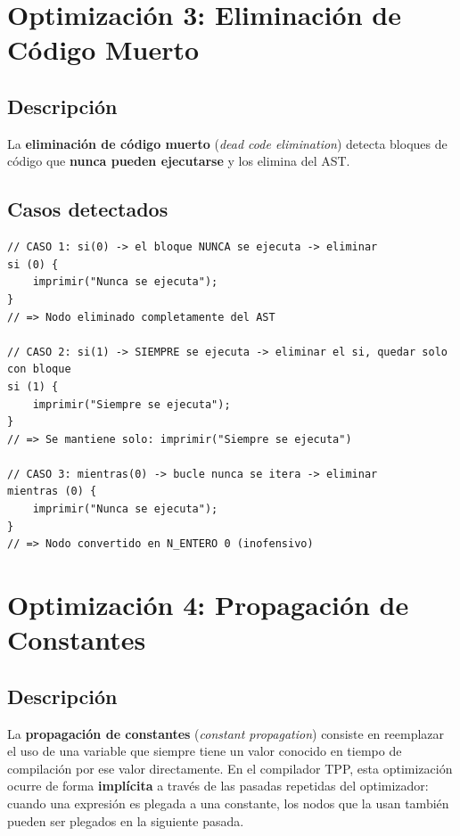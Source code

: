 \section{Optimización 3: Eliminación de Código Muerto}

\subsection{Descripción}

La \textbf{eliminación de código muerto} (\textit{dead code elimination}) detecta bloques de código que \textbf{nunca pueden ejecutarse} y los elimina del AST.

\subsection{Casos detectados}

\begin{lstlisting}[style=tppstyle, caption={Casos de código muerto eliminados}]
// CASO 1: si(0) -> el bloque NUNCA se ejecuta -> eliminar
si (0) {
    imprimir("Nunca se ejecuta");
}
// => Nodo eliminado completamente del AST

// CASO 2: si(1) -> SIEMPRE se ejecuta -> eliminar el si, quedar solo con bloque
si (1) {
    imprimir("Siempre se ejecuta");
}
// => Se mantiene solo: imprimir("Siempre se ejecuta")

// CASO 3: mientras(0) -> bucle nunca se itera -> eliminar
mientras (0) {
    imprimir("Nunca se ejecuta");
}
// => Nodo convertido en N_ENTERO 0 (inofensivo)
\end{lstlisting}

\section{Optimización 4: Propagación de Constantes}

\subsection{Descripción}

La \textbf{propagación de constantes} (\textit{constant propagation}) consiste en reemplazar el uso de una variable que siempre tiene un valor conocido en tiempo de compilación por ese valor directamente. En el compilador TPP, esta optimización ocurre de forma \textbf{implícita} a través de las pasadas repetidas del optimizador: cuando una expresión es plegada a una constante, los nodos que la usan también pueden ser plegados en la siguiente pasada.

